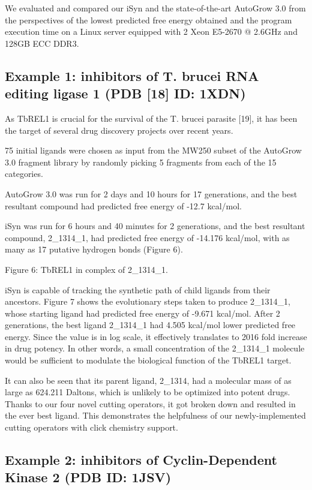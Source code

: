 We evaluated and compared our iSyn and the state-of-the-art AutoGrow 3.0 from the perspectives of the lowest predicted free energy obtained and the program execution time on a Linux server equipped with 2 Xeon E5-2670 @ 2.6GHz and 128GB ECC DDR3.

\subsection{Example 1: inhibitors of T. brucei RNA editing ligase 1 (PDB [18] ID: 1XDN)}

As TbREL1 is crucial for the survival of the T. brucei parasite [19], it has been the target of several drug discovery projects over recent years.

75 initial ligands were chosen as input from the MW250 subset of the AutoGrow 3.0 fragment library by randomly picking 5 fragments from each of the 15 categories.

AutoGrow 3.0 was run for 2 days and 10 hours for 17 generations, and the best resultant compound had predicted free energy of -12.7 kcal/mol.

iSyn was run for 6 hours and 40 minutes for 2 generations, and the best resultant compound, 2\_1314\_1, had predicted free energy of -14.176 kcal/mol, with as many as 17 putative hydrogen bonds (Figure 6).

 
Figure 6: TbREL1 in complex of 2\_1314\_1.

iSyn is capable of tracking the synthetic path of child ligands from their ancestors. Figure 7 shows the evolutionary steps taken to produce 2\_1314\_1, whose starting ligand had predicted free energy of -9.671 kcal/mol. After 2 generations, the best ligand 2\_1314\_1 had 4.505 kcal/mol lower predicted free energy. Since the value is in log scale, it effectively translates to 2016 fold increase in drug potency. In other words, a small concentration of the 2\_1314\_1 molecule would be sufficient to modulate the biological function of the TbREL1 target.

It can also be seen that its parent ligand, 2\_1314, had a molecular mass of as large as 624.211 Daltons, which is unlikely to be optimized into potent drugs. Thanks to our four novel cutting operators, it got broken down and resulted in the ever best ligand. This demonstrates the helpfulness of our newly-implemented cutting operators with click chemistry support.

\subsection{Example 2: inhibitors of Cyclin-Dependent Kinase 2 (PDB ID: 1JSV)}

